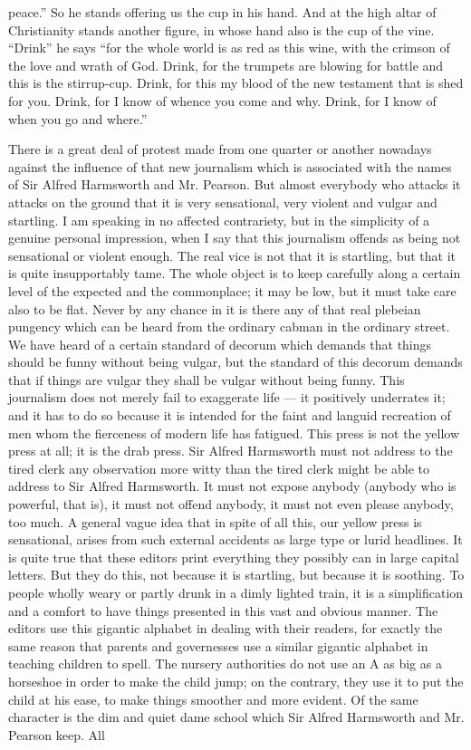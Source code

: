 peace.” So he stands offering us the cup in his hand. And at the high altar of Christianity stands another figure, in whose hand also is the cup of the vine. “Drink” he says “for the whole world is as red as this wine, with the crimson of the love and wrath of God. Drink, for the trumpets are blowing for battle and this is the stirrup-cup. Drink, for this my blood of the new testament that is shed for you. Drink, for I know of whence you come and why. Drink, for I know of when you go and where.”


There is a great deal of protest made from one quarter or another nowadays against the influence of that new journalism which is associated with the names of Sir Alfred Harmsworth and Mr. Pearson. But almost everybody who attacks it attacks on the ground that it is very sensational, very violent and vulgar and startling. I am speaking in no affected contrariety, but in the simplicity of a genuine personal impression, when I say that this journalism offends as being not sensational or violent enough. The real vice is not that it is startling, but that it is quite insupportably tame. The whole object is to keep carefully along a certain level of the expected and the commonplace; it may be low, but it must take care also to be flat. Never by any chance in it is there any of that real plebeian pungency which can be heard from the ordinary cabman in the ordinary street. We have heard of a certain standard of decorum which demands that things should be funny without being vulgar, but the standard of this decorum demands that if things are vulgar they shall be vulgar without being funny. This journalism does not merely fail to exaggerate life — it positively underrates it; and it has to do so because it is intended for the faint and languid recreation of men whom the fierceness of modern life has fatigued. This press is not the yellow press at all; it is the drab press. Sir Alfred Harmsworth must not address to the tired clerk any observation more witty than the tired clerk might be able to address to Sir Alfred Harmsworth. It must not expose anybody (anybody who is powerful, that is), it must not offend anybody, it must not even please anybody, too much. A general vague idea that in spite of all this, our yellow press is sensational, arises from such external accidents as large type or lurid headlines. It is quite true that these editors print everything they possibly can in large capital letters. But they do this, not because it is startling, but because it is soothing. To people wholly weary or partly drunk in a dimly lighted train, it is a simplification and a comfort to have things presented in this vast and obvious manner. The editors use this gigantic alphabet in dealing with their readers, for exactly the same reason that parents and governesses use a similar gigantic alphabet in teaching children to spell. The nursery authorities do not use an A as big as a horseshoe in order to make the child jump; on the contrary, they use it to put the child at his ease, to make things smoother and more evident. Of the same character is the dim and quiet dame school which Sir Alfred Harmsworth and Mr. Pearson keep. All 